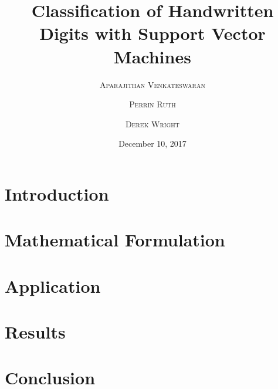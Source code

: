 \documentclass[11pt, onecolumn]{article}
\title{Classification of Handwritten Digits with Support Vector Machines} %
\author{%
\textsc{Aparajithan Venkateswaran} \\[1ex] %
\and %
\textsc{Perrin Ruth} \\[1ex] %
\and %
\textsc{Derek Wright} \\[1ex] %
}
\date{December 10, 2017} %
\begin{document}
\maketitle


\section{Introduction}




\section{Mathematical Formulation}




\section{Application}




\section{Results}




\section{Conclusion}



%
%

\newpage
\nocite{*}



%
%

\clearpage
\newpage
\onecolumn
\appendix







\end{document}

